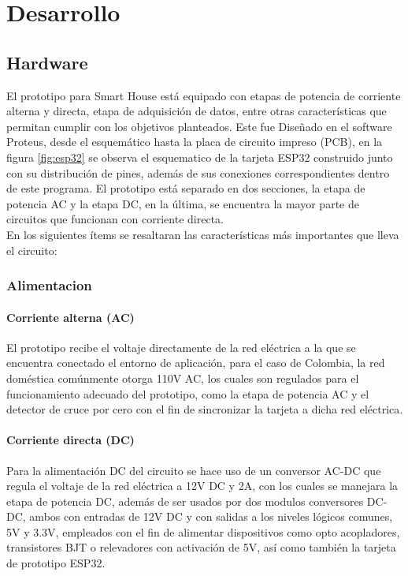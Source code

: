 \section{Desarrollo}
\subsection{Hardware}\label{sec:hw}

El prototipo para Smart House está equipado con etapas de potencia de corriente alterna y directa, etapa de adquisición de datos, entre otras características que permitan cumplir con los objetivos planteados. Este fue Diseñado en el software Proteus, desde el esquemático hasta la placa de circuito impreso (PCB), en la figura \ref{fig:esp32} se observa el esquematico de la tarjeta ESP32 construido junto con su distribución de pines, además de sus conexiones correspondientes dentro de este programa. El prototipo está separado en dos secciones, la etapa de potencia AC y la etapa DC, en la última, se encuentra la mayor parte de circuitos que funcionan con corriente directa.\\


En los siguientes ítems se resaltaran las características más importantes que lleva el circuito:\\

	\subsubsection{Alimentacion}
	
	\paragraph{Corriente alterna (AC)}
		El prototipo recibe el voltaje directamente de la red eléctrica a la que se encuentra conectado el entorno de aplicación, para el caso de Colombia, la red doméstica comúnmente otorga 110V AC, los cuales son regulados para el funcionamiento adecuado del prototipo, como la etapa de potencia AC y el detector de cruce por cero con el fin de sincronizar la tarjeta a dicha red eléctrica.\\
		
	\paragraph{Corriente directa (DC)}
		Para la alimentación DC del circuito se hace uso de un conversor AC-DC que regula el voltaje de la red eléctrica a 12V DC y 2A, con los cuales se manejara la etapa de potencia DC, además de ser usados por dos modulos conversores DC-DC, ambos con entradas de 12V DC y con salidas a los niveles lógicos comunes, 5V y 3.3V, empleados con el fin de alimentar dispositivos como opto acopladores, transistores BJT o relevadores con activación de 5V, así como también la tarjeta de prototipo ESP32.\\
			
